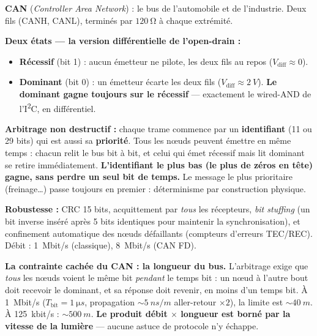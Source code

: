 \documentclass[12pt,a4paper,twoside]{book}
\begin{document}
\begin{formule}
\textbf{CAN} (\textit{Controller Area Network}) : le bus de l'automobile et de l'industrie. Deux fils (CANH, CANL), terminés par $\SI{120}{\ohm}$ à chaque extrémité.

\textbf{Deux états --- la version différentielle de l'open-drain :}
\begin{itemize}[nosep]
\item \textbf{Récessif} (bit 1) : aucun émetteur ne pilote, les deux fils au repos ($V_{\text{diff}} \approx 0$).
\item \textbf{Dominant} (bit 0) : un émetteur écarte les deux fils ($V_{\text{diff}} \approx \SI{2}{V}$). \textbf{Le dominant gagne toujours sur le récessif} --- exactement le wired-AND de l'I\textsuperscript{2}C, en différentiel.
\end{itemize}

\textbf{Arbitrage non destructif :} chaque trame commence par un \textbf{identifiant} (11 ou 29 bits) qui est aussi sa \textbf{priorité}. Tous les nœuds peuvent émettre en même temps : chacun relit le bus bit à bit, et celui qui émet récessif mais lit dominant se retire immédiatement. \textbf{L'identifiant le plus bas (le plus de zéros en tête) gagne, sans perdre un seul bit de temps.} Le message le plus prioritaire (freinage\ldots) passe toujours en premier : déterminisme par construction physique.

\textbf{Robustesse :} CRC 15 bits, acquittement par \textit{tous} les récepteurs, \textit{bit stuffing} (un bit inverse inséré après 5 bits identiques pour maintenir la synchronisation), et confinement automatique des nœuds défaillants (compteurs d'erreurs TEC/REC). Débit : \SI{1}{Mbit/s} (classique), \SI{8}{Mbit/s} (CAN FD).
\end{formule}

\begin{intuition}
\textbf{La contrainte cachée du CAN : la longueur du bus.} L'arbitrage exige que \textit{tous} les nœuds voient le même bit \textit{pendant} le temps bit : un nœud à l'autre bout doit recevoir le dominant, et sa réponse doit revenir, en moins d'un temps bit. À \SI{1}{Mbit/s} ($T_{\text{bit}} = \SI{1}{\micro s}$, propagation $\sim\SI{5}{ns/m}$ aller-retour $\times 2$), la limite est $\sim\SI{40}{m}$. À \SI{125}{kbit/s} : $\sim\SI{500}{m}$. \textbf{Le produit débit $\times$ longueur est borné par la vitesse de la lumière} --- aucune astuce de protocole n'y échappe.
\end{intuition}
\end{document}

